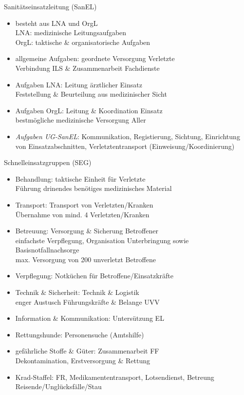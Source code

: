 \begin{sectionbox}{Sanitätseinsatzleitung (SanEL)}
    \begin{itemize}
        \item besteht aus LNA und OrgL\\
        \ra LNA: medizinische Leitungsaufgaben\\
        \ra OrgL: taktische \& organisatorische Aufgaben
        \item allgemeine Aufgaben: geordnete Versorgung Verletzte\\
        \ra Verbindung ILS \& Zusammenarbeit Fachdienste  
        \item Aufgaben LNA: Leitung ärztlicher Einsatz\\
        \ra Feststellung \& Beurteilung aus medizinischer Sicht
        \item Aufgaben OrgL:  Leitung \& Koordination Einsatz\\
        \ra bestmögliche medizinische Versorgung Aller
        \item \emph{Aufgaben UG-SanEL}: Kommunikation, Registierung, Sichtung, Einrichtung von Einsatzabschnitten, Verletztentransport (Einweisung/Koordinierung)
    \end{itemize}
\end{sectionbox}
\begin{sectionbox}{Schnelleinsatzgruppen (SEG)}
    \begin{itemize}
        \item Behandlung: taktische Einheit für Verletzte\\
        \ra Führung drinendes benötiges medizinisches Material
        \item Transport: Transport von Verletzten/Kranken\\
        \ra Übernahme von mind. 4 Verletzten/Kranken
        \item Betreuung: Versorgung \& Sicherung Betroffener\\
        \ra einfachste Verpflegung, Organisation Unterbringung sowie Basisnotfallnachsorge\\
        \ra max. Versorgung von 200 unverletzt Betroffene
        \item Verpflegung: Notküchen  für Betroffene/Einsatzkräfte
        \item Technik \& Sicherheit: Technik \& Logistik\\
        \ra enger Austusch Führungskräfte \& Belange UVV 
        \item Information \& Kommunikation: Untersützung EL
        \item Rettungshunde: Personensuche (Amtshilfe)
        \item gefährliche Stoffe \& Güter: Zusammenarbeit FF\\
        \ra Dekontamination, Erstversorgung \& Rettung 
        \item Krad-Staffel: FR, Medikamententransport, Lotsendienst, Betreung Reisende/Unglücksfälle/Stau 
    \end{itemize}
\end{sectionbox}
